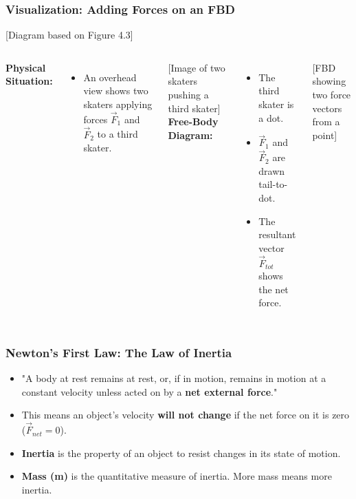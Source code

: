 \documentclass{beamer}
\begin{document}
\begin{frame}
\frametitle{Visualization: Adding Forces on an FBD}
\begin{alertblock}{[Diagram based on Figure 4.3]}
\begin{columns}[T]
    \textbf{Physical Situation:}
    \begin{itemize}
        \item An overhead view shows two skaters applying forces $\vec{F}_1$ and $\vec{F}_2$ to a third skater.
    \end{itemize}
    \alert{[Image of two skaters pushing a third skater]}
    \textbf{Free-Body Diagram:}
    \begin{itemize}
        \item The third skater is a dot.
        \item $\vec{F}_1$ and $\vec{F}_2$ are drawn tail-to-dot.
        \item The resultant vector $\vec{F}_{tot}$ shows the net force.
    \end{itemize}
    \alert{[FBD showing two force vectors from a point]}
\end{columns}
\end{alertblock}
\end{frame}

\begin{frame}
\frametitle{Newton's First Law: The Law of Inertia}
\begin{itemize}
    \item "A body at rest remains at rest, or, if in motion, remains in motion at a constant velocity unless acted on by a \textbf{net external force}." \pause
    \item This means an object's velocity \textbf{will not change} if the net force on it is zero ($\vec{F}_{net} = 0$). \pause
    \item \textbf{Inertia} is the property of an object to resist changes in its state of motion. \pause
    \item \textbf{Mass (m)} is the quantitative measure of inertia. More mass means more inertia.
\end{itemize}
\end{frame}
\end{document}
